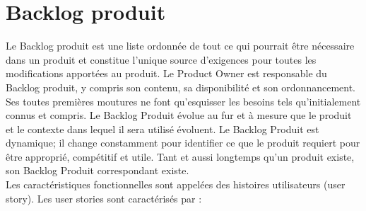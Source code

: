 \section{Backlog produit}
Le Backlog produit est une liste ordonnée de tout ce qui pourrait être nécessaire dans un produit et constitue l’unique source d'exigences pour toutes les modifications apportées au produit. Le Product Owner est responsable du Backlog produit, y compris son contenu, sa disponibilité et son ordonnancement.\\
 Ses toutes premières moutures ne font qu’esquisser les besoins tels qu’initialement connus et compris. Le Backlog Produit évolue au fur et à mesure que le produit et le contexte dans lequel il sera utilisé évoluent. Le Backlog Produit est dynamique; il change constamment pour identifier ce que le produit requiert pour être approprié, compétitif et utile. Tant et aussi longtemps qu’un produit existe, son Backlog Produit correspondant existe.\\
 Les caractéristiques fonctionnelles sont appelées
 des histoires utilisateurs (user story). Les user stories sont caractérisés par :\\
